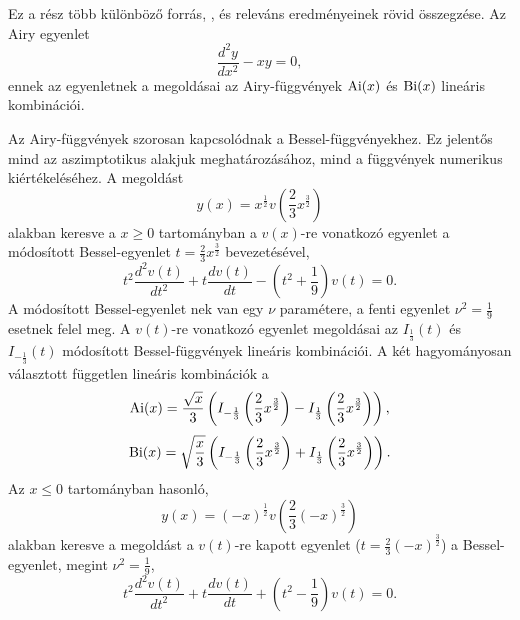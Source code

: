 \label{airy}
Ez a rész több különböző forrás, \cite{beals_wong_2010}, \cite{Albright_1977} és \cite{Vallee:2010:AFA} releváns eredményeinek rövid összegzése. Az Airy egyenlet
\begin{equation}
	\frac{d^2y}{dx^2} - xy = 0,
	\label{airy:airyeq}
\end{equation}
ennek az egyenletnek a megoldásai az Airy-függvények $\operatorname{Ai}(x)$ és $\operatorname{Bi}(x)$ lineáris kombinációi.

Az Airy-függvények szorosan kapcsolódnak a Bessel-függvényekhez. Ez jelentős mind az aszimptotikus alakjuk meghatározásához, mind a függvények numerikus kiértékeléséhez. A megoldást
\begin{equation}
	y(x) = x^{\frac{1}{2}}v\left(\frac{2}{3}x^{\frac{3}{2}}\right)
\end{equation}
alakban keresve a $x \geq 0$ tartományban a $v(x)$-re vonatkozó egyenlet a módosított Bessel-egyenlet $t=\frac{2}{3}x^{\frac{3}{2}}$ bevezetésével,
\begin{equation}
	t^2\frac{d^2v(t)}{dt^2} + t\frac{dv(t)}{dt} - \left(t^2 + \frac{1}{9}\right)v(t) = 0.
\end{equation}
A módosított Bessel-egyenlet nek van egy $\nu$ paramétere, a fenti egyenlet $\nu^2 = \frac{1}{9}$ esetnek felel meg. A $v(t)$-re vonatkozó egyenlet megoldásai az $I_{\frac{1}{3}}(t)$ és $I_{-\frac{1}{3}}(t)$ módosított Bessel-függvények lineáris kombinációi.
A két hagyományosan választott független lineáris kombinációk a
\begin{equation}
	\operatorname{Ai}(x) = \frac{\sqrt{x}}{3}\left(I_{-\frac{1}{3}}\left(\frac{2}{3}x^{\frac{3}{2}}\right)-I_{\frac{1}{3}}\left(\frac{2}{3}x^{\frac{3}{2}}\right)\right),
	\label{airy:ai+}
\end{equation}
\begin{equation}
	\operatorname{Bi}(x) = \sqrt{\frac{x}{3}}\left(I_{-\frac{1}{3}}\left(\frac{2}{3}x^{\frac{3}{2}}\right)+I_{\frac{1}{3}}\left(\frac{2}{3}x^{\frac{3}{2}}\right)\right).
	\label{airy:ai+}
\end{equation}
Az $x \leq 0$ tartományban hasonló,
\begin{equation}
	y(x) = (-x)^{\frac{1}{2}}v\left(\frac{2}{3}(-x)^{\frac{3}{2}}\right)
\end{equation}
alakban keresve a megoldást a $v(t)$-re kapott egyenlet ($t=\frac{2}{3}(-x)^{\frac{3}{2}}$) a Bessel-egyenlet, megint $\nu^2 = \frac{1}{9}$,
\begin{equation}
	t^2\frac{d^2v(t)}{dt^2} + t\frac{dv(t)}{dt} + \left(t^2 - \frac{1}{9}\right)v(t) = 0.
\end{equation}
